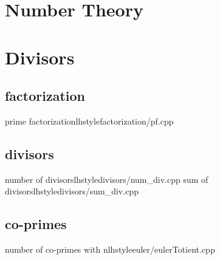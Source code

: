 \section{Number Theory}
    \section{Divisors}
      \subsection{factorization}
         {prime factorization}{lhstyle}{factorization/pf.cpp}
      \subsection{divisors}
         {number of divisors}{lhstyle}{divisors/num_div.cpp}
         {sum of divisors}{lhstyle}{divisors/sum_div.cpp}
      \subsection{co-primes}
         {number of co-primes with n}{lhstyle}{euler/eulerTotient.cpp}
    
